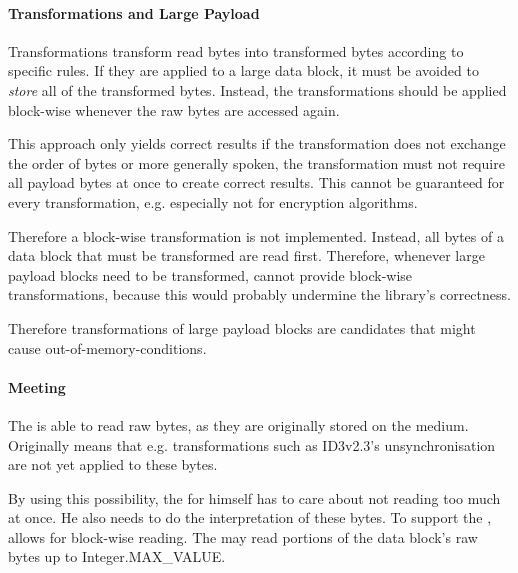 
\paragraph{Transformations and Large Payload}
\label{sec:TransformationsandLargePayload}

Transformations transform read bytes into transformed bytes according to specific rules. If they are applied to a large data block, it must be avoided to \emph{store} all of the transformed bytes. Instead, the transformations should be applied block-wise whenever the raw bytes are accessed again.

This approach only yields correct results if the transformation does not exchange the order of bytes or more generally spoken, the transformation must not require all payload bytes at once to create correct results. This cannot be guaranteed for every transformation, e.g. especially not for encryption algorithms.

Therefore a block-wise transformation is not implemented. Instead, all bytes of a data block that must be transformed are read first. Therefore, whenever large payload blocks need to be transformed, \LibName{} cannot provide block-wise transformations, because this would probably undermine the library's correctness.

Therefore transformations of large payload blocks are candidates that might cause out-of-memory-conditions.


\paragraph{Meeting \REQUcrlRawByteRetrieval{}}
\label{sec:MeetingREQUcrlRawByteRetrieval}

The \ACTORuser{} is able to read raw bytes, as they are originally stored on the medium. Originally means that e.g. transformations such as ID3v2.3's unsynchronisation are not yet applied to these bytes.

By using this possibility, the \ACTORuser{} for himself has to care about not reading too much at once. He also needs to do the interpretation of these bytes. To support the \ACTORuser{}, \LibName{} allows for block-wise reading. The \ACTORuser{} may read portions of the data block's raw bytes up to Integer.MAX_VALUE.

